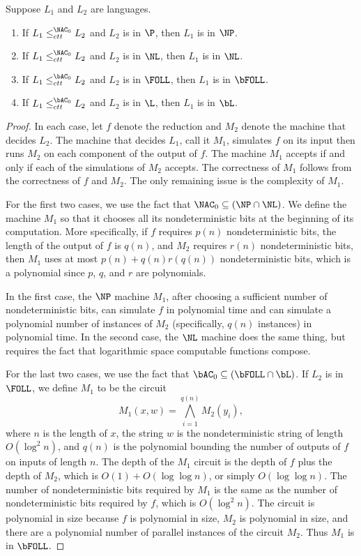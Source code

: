 \documentclass{article}
\begin{document}
\begin{lemma}\label{lem:ctt}
  Suppose $L_1$ and $L_2$ are languages.
  \begin{enumerate}
  \item If $L_1 \leq^{\NAC_0}_{ctt} L_2$ and $L_2$ is in $\P$, then $L_1$ is in $\NP$.
  \item If $L_1 \leq^{\NAC_0}_{ctt} L_2$ and $L_2$ is in $\NL$, then $L_1$ is in $\NL$.
  \item If $L_1 \leq^{\bAC_0}_{ctt} L_2$ and $L_2$ is in $\FOLL$, then $L_1$ is in $\bFOLL$.
  \item If $L_1 \leq^{\bAC_0}_{ctt} L_2$ and $L_2$ is in $\L$, then $L_1$ is in $\bL$.
  \end{enumerate}
\end{lemma}
\begin{proof}
  In each case, let $f$ denote the reduction and $M_2$ denote the machine that decides $L_2$.
  The machine that decides $L_1$, call it $M_1$, simulates $f$ on its input then runs $M_2$ on each component of the output of $f$.
  The machine $M_1$ accepts if and only if each of the simulations of $M_2$ accepts.
  The correctness of $M_1$ follows from the correctness of $f$ and $M_2$.
  The only remaining issue is the complexity of $M_1$.

  For the first two cases, we use the fact that $\NAC_0 \subseteq (\NP \cap \NL)$.
  We define the machine $M_1$ so that it chooses all its nondeterministic bits at the beginning of its computation.
  More specifically, if $f$ requires $p(n)$ nondeterministic bits, the length of the output of $f$ is $q(n)$, and $M_2$ requires $r(n)$ nondeterministic bits, then $M_1$ uses at most $p(n) + q(n) r(q(n))$ nondeterministic bits, which is a polynomial since $p$, $q$, and $r$ are polynomials.

  In the first case, the $\NP$ machine $M_1$, after choosing a sufficient number of nondeterministic bits, can simulate $f$ in polynomial time and can simulate a polynomial number of instances of $M_2$ (specifically, $q(n)$ instances) in polynomial time.
  In the second case, the $\NL$ machine does the same thing, but requires the fact that logarithmic space computable functions compose.

  For the last two cases, we use the fact that $\bAC_0 \subseteq (\bFOLL \cap \bL)$.
  If $L_2$ is in $\FOLL$, we define $M_1$ to be the circuit
  \begin{equation*}
    M_1(x, w) = \bigwedge_{i = 1}^{q(n)} M_2(y_i),
  \end{equation*}
  where $n$ is the length of $x$, the string $w$ is the nondeterministic string of length $O(\log^2 n)$, and $q(n)$ is the polynomial bounding the number of outputs of $f$ on inputs of length $n$.
  The depth of the $M_1$ circuit is the depth of $f$ plus the depth of $M_2$, which is $O(1) + O(\log \log n)$, or simply $O(\log \log n)$.
  The number of nondeterministic bits required by $M_1$ is the same as the number of nondeterministic bits required by $f$, which is $O(\log^2 n)$.
  The circuit is polynomial in size because $f$ is polynomial in size, $M_2$ is polynomial in size, and there are a polynomial number of parallel instances of the circuit $M_2$.
  Thus $M_1$ is in $\bFOLL$.


\end{proof}
\end{document}

